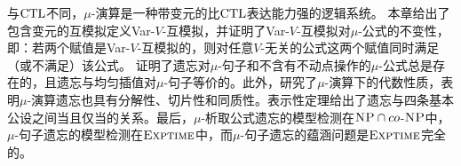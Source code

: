 与$\textrm{CTL}$不同，$\mu$-演算是一种带变元的比$\textrm{CTL}$表达能力强的逻辑系统。
本章给出了包含变元的互模拟定义Var-$V$-互模拟，并证明了Var-$V$-互模拟对$\mu$-公式的不变性，即：若两个赋值是Var-$V$-互模拟的，则对任意$V$-无关的公式这两个赋值同时满足（或不满足）该公式。
证明了遗忘对$\mu$-句子和不含有不动点操作的$\mu$-公式总是存在的，且遗忘与均匀插值对$\mu$-句子等价的。此外，研究了$\mu$-演算下的代数性质，表明$\mu$-演算遗忘也具有分解性、切片性和同质性。表示性定理给出了遗忘与四条基本公设之间当且仅当的关系。最后，$\mu$-析取公式遗忘的模型检测在$\textsc{NP}\cap co$-$\textsc{NP}$中，$\mu$-句子遗忘的模型检测在$\textsc{Exptime}$中，而$\mu$-句子遗忘的蕴涵问题是$\textsc{Exptime}$完全的。


